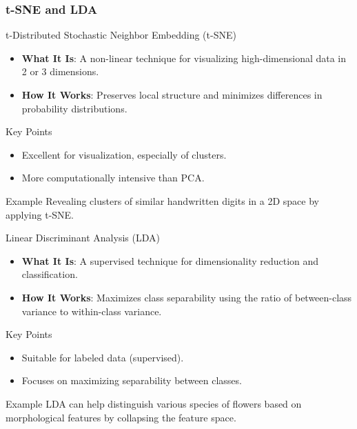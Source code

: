 \documentclass[aspectratio=169]{beamer}
\begin{document}
\begin{frame}[fragile]
    \frametitle{t-SNE and LDA}
    \begin{block}{t-Distributed Stochastic Neighbor Embedding (t-SNE)}
        \begin{itemize}
            \item \textbf{What It Is}: A non-linear technique for visualizing high-dimensional data in 2 or 3 dimensions.
            \item \textbf{How It Works}: Preserves local structure and minimizes differences in probability distributions.
        \end{itemize}
        \begin{block}{Key Points}
            \begin{itemize}
                \item Excellent for visualization, especially of clusters.
                \item More computationally intensive than PCA.
            \end{itemize}
        \end{block}
        \begin{block}{Example}
            Revealing clusters of similar handwritten digits in a 2D space by applying t-SNE.
        \end{block}
    \end{block}
    
    \begin{block}{Linear Discriminant Analysis (LDA)}
        \begin{itemize}
            \item \textbf{What It Is}: A supervised technique for dimensionality reduction and classification.
            \item \textbf{How It Works}: Maximizes class separability using the ratio of between-class variance to within-class variance.
        \end{itemize}
        \begin{block}{Key Points}
            \begin{itemize}
                \item Suitable for labeled data (supervised).
                \item Focuses on maximizing separability between classes.
            \end{itemize}
        \end{block}
        \begin{block}{Example}
            LDA can help distinguish various species of flowers based on morphological features by collapsing the feature space.
        \end{block}
    \end{block}
\end{frame}
\end{document}
